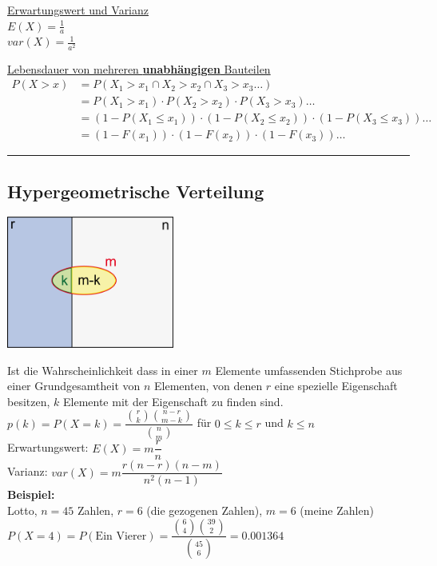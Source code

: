     \begin{minipage}[t]{6cm}
      \underline{Erwartungswert und Varianz}\\
      $E(X)=\frac{1}{a}$\\
      $var(X)=\frac{1}{a^2}$ 
    \end{minipage}
    \begin{minipage}[t]{9cm}
      \underline{Lebensdauer von mehreren \textbf{unabhängigen} Bauteilen}\\
      \begin{align}
        P(X>x) &= P(X_1>x_1 \cap X_2>x_2 \cap X_3>x_3 \ldots) \nonumber \\
        &= P(X_1>x_1) \cdot P(X_2>x_2) \cdot P(X_3>x_3) \ldots \nonumber \\
        &= (1-P(X_1\leq x_1)) \cdot (1-P(X_2\leq x_2)) \cdot (1-P(X_3\leq x_3)) \ldots \nonumber \\
        &= (1-F(x_1)) \cdot (1-F(x_2)) \cdot (1-F(x_3)) \ldots \nonumber
      \end{align}
    \end{minipage}
		
	\hrule

	\subsection{Hypergeometrische Verteilung \skript{\pageref{sk-section-hypergeometrischeverteilung}}}
	    \begin{floatingfigure}[r]{5.5cm}
        	\includegraphics[width=5.5cm]{./bilder/hypergeo.png}
        \end{floatingfigure}
        Ist die Wahrscheinlichkeit dass in einer $m$ Elemente umfassenden 
		Stichprobe aus einer Grundgesamtheit von $n$ Elementen, von denen $r$ eine
		spezielle Eigenschaft besitzen, $k$ Elemente mit der Eigenschaft zu
		finden sind.\\
		\vspace{5mm} 
		$p(k)=P(X=k)=\dfrac{\binom r k \binom{n-r}{m-k}}{\binom n m}$ 
        \hspace{10mm} für $0\leq k \leq r$ und $k \leq n$\\
        Erwartungswert: \hspace{10mm} $E(X)=m \dfrac{r}{n}$\\
        Varianz: \hspace{22mm} $var(X)=m \dfrac{r(n-r)(n-m)}{n^2(n-1)}$ \\
		{\bf Beispiel:} \\
		Lotto, $n=45$ Zahlen, $r=6$ (die gezogenen Zahlen), $m=6$
		(meine Zahlen) \\
		$P(X=4)=P(\text{Ein Vierer})=\dfrac{\binom 6 4 \binom {39}
		2}{\binom {45} 6}=0.001364$	\\

